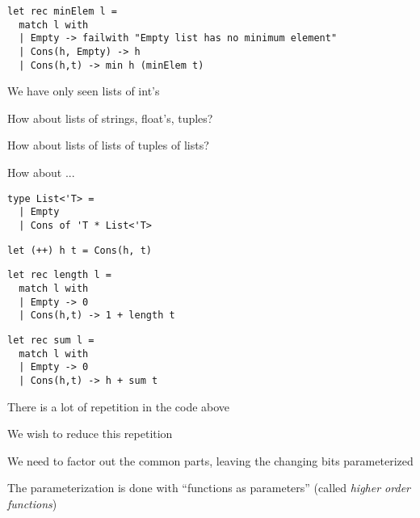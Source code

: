 \documentclass{beamer}
\begin{document}
\begin{frame}[fragile]
\begin{lstlisting}
let rec minElem l =
  match l with
  | Empty -> failwith "Empty list has no minimum element"
  | Cons(h, Empty) -> h
  | Cons(h,t) -> min h (minElem t)
\end{lstlisting}
\end{frame}

\begin{slide}{
\item We have only seen lists of int's
\item How about lists of strings, float's, tuples?
\item How about lists of lists of tuples of lists?
\item How about ...
}\end{slide}

\begin{frame}[fragile]
\begin{lstlisting}
type List<'T> =
  | Empty
  | Cons of 'T * List<'T>
\end{lstlisting}
\end{frame}

\begin{frame}[fragile]
\begin{lstlisting}
let (++) h t = Cons(h, t)
\end{lstlisting}
\end{frame}

\begin{frame}[fragile]
\begin{lstlisting}
let rec length l =
  match l with
  | Empty -> 0
  | Cons(h,t) -> 1 + length t
\end{lstlisting}
\end{frame}

\begin{frame}[fragile]
\begin{lstlisting}
let rec sum l =
  match l with
  | Empty -> 0
  | Cons(h,t) -> h + sum t
\end{lstlisting}
\end{frame}

\begin{slide}{
\item There is a lot of repetition in the code above
\item We wish to reduce this repetition
\item We need to factor out the common parts, leaving the changing bits parameterized
\item The parameterization is done with ``functions as parameters'' (called \textit{higher order functions})
}\end{slide}
\end{document}

